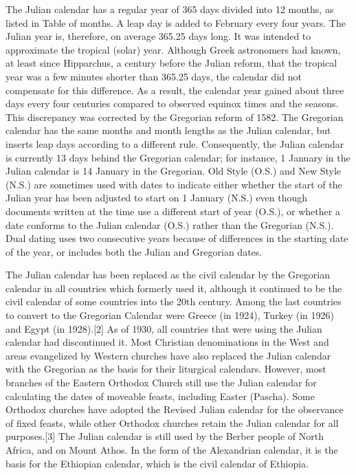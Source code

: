 The Julian calendar has a regular year of 365 days divided into 12 months, as listed in Table of months. A leap day is added to February every four years. The Julian year is, therefore, on average 365.25 days long. It was intended to approximate the tropical (solar) year. Although Greek astronomers had known, at least since Hipparchus, a century before the Julian reform, that the tropical year was a few minutes shorter than 365.25 days, the calendar did not compensate for this difference. As a result, the calendar year gained about three days every four centuries compared to observed equinox times and the seasons. This discrepancy was corrected by the Gregorian reform of 1582. The Gregorian calendar has the same months and month lengths as the Julian calendar, but inserts leap days according to a different rule. Consequently, the Julian calendar is currently 13 days behind the Gregorian calendar; for instance, 1 January in the Julian calendar is 14 January in the Gregorian. Old Style (O.S.) and New Style (N.S.) are sometimes used with dates to indicate either whether the start of the Julian year has been adjusted to start on 1 January (N.S.) even though documents written at the time use a different start of year (O.S.), or whether a date conforms to the Julian calendar (O.S.) rather than the Gregorian (N.S.). Dual dating uses two consecutive years because of differences in the starting date of the year, or includes both the Julian and Gregorian dates.

The Julian calendar has been replaced as the civil calendar by the Gregorian calendar in all countries which formerly used it, although it continued to be the civil calendar of some countries into the 20th century. Among the last countries to convert to the Gregorian Calendar were Greece (in 1924), Turkey (in 1926) and Egypt (in 1928).[2] As of 1930, all countries that were using the Julian calendar had discontinued it. Most Christian denominations in the West and areas evangelized by Western churches have also replaced the Julian calendar with the Gregorian as the basis for their liturgical calendars. However, most branches of the Eastern Orthodox Church still use the Julian calendar for calculating the dates of moveable feasts, including Easter (Pascha). Some Orthodox churches have adopted the Revised Julian calendar for the observance of fixed feasts, while other Orthodox churches retain the Julian calendar for all purposes.[3] The Julian calendar is still used by the Berber people of North Africa, and on Mount Athos. In the form of the Alexandrian calendar, it is the basis for the Ethiopian calendar, which is the civil calendar of Ethiopia.

